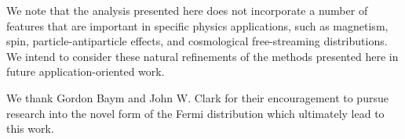 \documentclass[sn-mathphys,Numbered]{sn-jnl}
\begin{document}
We note that the analysis presented here does not incorporate a number of features that are important in specific physics applications, such as magnetism, spin, particle-antiparticle effects, and cosmological free-streaming distributions.   We intend to consider these natural refinements of the methods presented here in future application-oriented work.
 







\backmatter

We thank Gordon Baym and John W. Clark for their encouragement to pursue research into the novel form of the Fermi distribution which ultimately lead to this work.


\end{document}
